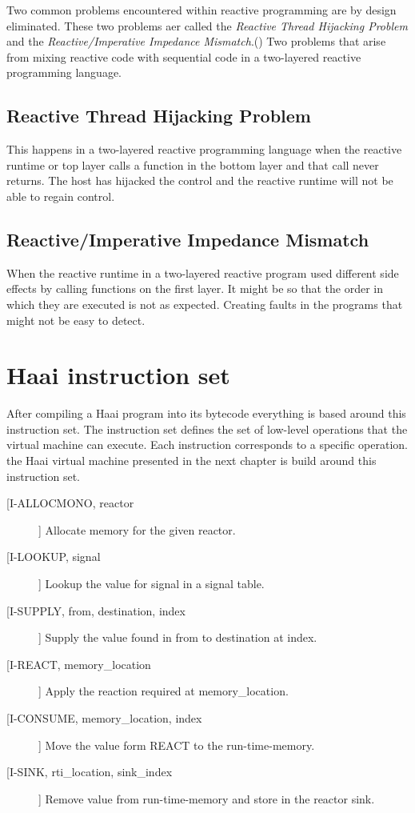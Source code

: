 \documentclass[a4paper]{book}
\begin{document}
 Two common problems encountered within reactive programming are by design eliminated. These two problems aer called the \textit{Reactive Thread Hijacking Problem} and the \textit{Reactive/Imperative Impedance Mismatch}.(\cite{vonder_tackling_2020}) Two problems that arise from mixing reactive code with sequential code in a two-layered reactive programming language. 

\subsection*{Reactive Thread Hijacking Problem}
This happens in a two-layered reactive programming language when the reactive runtime or top layer calls a function in the bottom layer and that call never returns. The host has hijacked the control and the reactive runtime will not be able to regain control.  

\subsection*{Reactive/Imperative Impedance Mismatch}
When the reactive runtime in a two-layered reactive program used different side effects by calling functions on the first layer. It might be so that the order in which they are executed is not as expected. Creating faults in the programs that might not be easy to detect.
\section{Haai instruction set}
After compiling a Haai program into its bytecode everything is based around this instruction set. The instruction set defines the set of low-level operations that the virtual machine can execute. Each instruction corresponds to a specific operation. the Haai virtual machine presented in the next chapter is build around this instruction set. 


\begin{description}
	\item[[I-ALLOCMONO, reactor]] Allocate memory for the given reactor.
	\item[[I-LOOKUP, signal]] Lookup the value for signal in a signal table.
	\item[[I-SUPPLY, from, destination, index]] Supply the value found in from to destination at index.
	\item[[I-REACT, memory\_location]] Apply the reaction required at memory\_location.
	\item[[I-CONSUME, memory\_location, index]] Move the value form REACT to the run-time-memory.
	\item[[I-SINK, rti\_location, sink\_index]] Remove value from run-time-memory and store in the reactor sink.
\end{description}
\end{document}
